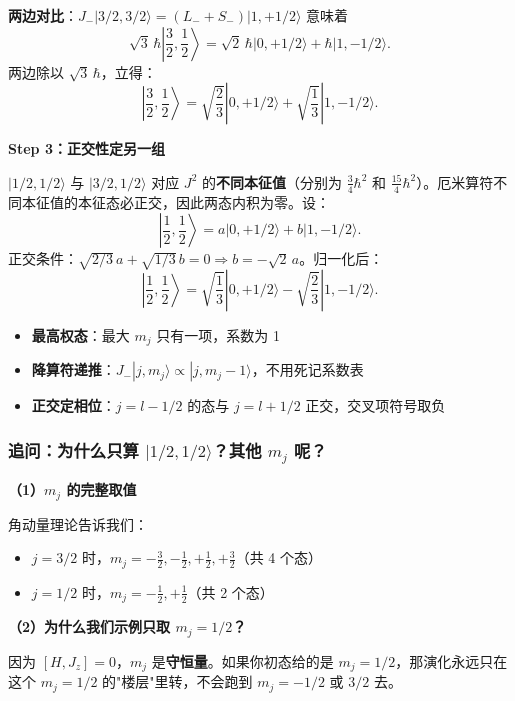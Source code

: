 \textbf{两边对比}：$J_- |3/2, 3/2\rangle = (L_- + S_-) |1, +1/2\rangle$ 意味着
\[
\sqrt{3}\,\hbar \left|\frac{3}{2}, \frac{1}{2}\right\rangle = \sqrt{2}\,\hbar |0, +1/2\rangle + \hbar |1, -1/2\rangle.
\]
两边除以 $\sqrt{3}\,\hbar$，立得：
\[
\left|\frac{3}{2}, \frac{1}{2}\right\rangle = \sqrt{\frac{2}{3}} |0, +1/2\rangle + \sqrt{\frac{1}{3}} |1, -1/2\rangle.
\]

\textbf{Step 3：正交性定另一组}

$|1/2, 1/2\rangle$ 与 $|3/2, 1/2\rangle$ 对应 $J^2$ 的\textbf{不同本征值}（分别为 $\frac{3}{4}\hbar^2$ 和 $\frac{15}{4}\hbar^2$）。厄米算符不同本征值的本征态必正交，因此两态内积为零。设：
\[
\left|\frac{1}{2}, \frac{1}{2}\right\rangle = a|0,+1/2\rangle + b|1,-1/2\rangle.
\]
正交条件：$\sqrt{2/3}\,a + \sqrt{1/3}\,b = 0 \Rightarrow b=-\sqrt{2}\,a$。归一化后：
\[
\left|\frac{1}{2}, \frac{1}{2}\right\rangle = \sqrt{\frac{1}{3}} |0,+1/2\rangle - \sqrt{\frac{2}{3}} |1,-1/2\rangle.
\]

\begin{tipbox}[考场口诀]
\begin{itemize}[nosep]
    \item \textbf{最高权态}：最大 $m_j$ 只有一项，系数为 1
    \item \textbf{降算符递推}：$J_- |j,m_j\rangle \propto |j,m_j-1\rangle$，不用死记系数表
    \item \textbf{正交定相位}：$j=l-1/2$ 的态与 $j=l+1/2$ 正交，交叉项符号取负
\end{itemize}
\end{tipbox}

\subsubsection*{追问：为什么只算 $|1/2, 1/2\rangle$？其他 $m_j$ 呢？}

\textbf{（1）$m_j$ 的完整取值}

角动量理论告诉我们：
\begin{itemize}[nosep]
    \item $j=3/2$ 时，$m_j = -\frac{3}{2}, -\frac{1}{2}, +\frac{1}{2}, +\frac{3}{2}$（共 4 个态）
    \item $j=1/2$ 时，$m_j = -\frac{1}{2}, +\frac{1}{2}$（共 2 个态）
\end{itemize}

\textbf{（2）为什么我们示例只取 $m_j = 1/2$？}

因为 $[H, J_z]=0$，$m_j$ 是\textbf{守恒量}。如果你初态给的是 $m_j=1/2$，那演化永远只在这个 $m_j=1/2$ 的"楼层"里转，不会跑到 $m_j=-1/2$ 或 $3/2$ 去。

